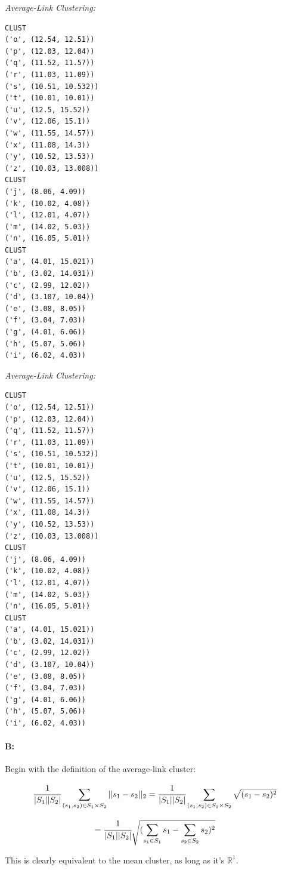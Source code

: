 \documentclass[11pt]{article}
\begin{document}
\textit{Average-Link Clustering:}
\begin{verbatim}
CLUST
('o', (12.54, 12.51))
('p', (12.03, 12.04))
('q', (11.52, 11.57))
('r', (11.03, 11.09))
('s', (10.51, 10.532))
('t', (10.01, 10.01))
('u', (12.5, 15.52))
('v', (12.06, 15.1))
('w', (11.55, 14.57))
('x', (11.08, 14.3))
('y', (10.52, 13.53))
('z', (10.03, 13.008))
CLUST
('j', (8.06, 4.09))
('k', (10.02, 4.08))
('l', (12.01, 4.07))
('m', (14.02, 5.03))
('n', (16.05, 5.01))
CLUST
('a', (4.01, 15.021))
('b', (3.02, 14.031))
('c', (2.99, 12.02))
('d', (3.107, 10.04))
('e', (3.08, 8.05))
('f', (3.04, 7.03))
('g', (4.01, 6.06))
('h', (5.07, 5.06))
('i', (6.02, 4.03))

\end{verbatim}

\textit{Average-Link Clustering:}
\begin{verbatim}
CLUST
('o', (12.54, 12.51))
('p', (12.03, 12.04))
('q', (11.52, 11.57))
('r', (11.03, 11.09))
('s', (10.51, 10.532))
('t', (10.01, 10.01))
('u', (12.5, 15.52))
('v', (12.06, 15.1))
('w', (11.55, 14.57))
('x', (11.08, 14.3))
('y', (10.52, 13.53))
('z', (10.03, 13.008))
CLUST
('j', (8.06, 4.09))
('k', (10.02, 4.08))
('l', (12.01, 4.07))
('m', (14.02, 5.03))
('n', (16.05, 5.01))
CLUST
('a', (4.01, 15.021))
('b', (3.02, 14.031))
('c', (2.99, 12.02))
('d', (3.107, 10.04))
('e', (3.08, 8.05))
('f', (3.04, 7.03))
('g', (4.01, 6.06))
('h', (5.07, 5.06))
('i', (6.02, 4.03))
\end{verbatim}


\paragraph{B: }

Begin with the definition of the average-link cluster:

\begin{equation}
\cfrac{1}{|S_1||S_2|} \sum_{(s_1,s_2) \in S_1 \times S_2} || s_1 - s_2||_2 = \cfrac{1}{|S_1||S_2|} \sum_{(s_1,s_2) \in S_1 \times S_2} \sqrt{(s_1 - s_2)^2}
\end{equation}

\begin{equation}
= \cfrac{1}{|S_1||S_2|} \sqrt{(\sum_{s_1 \in S_1} s_1 - \sum_{s_2 \in S_2} s_2)^2}
\end{equation}

This is clearly equivalent to the mean cluster, as long as it's $\mathbb{R}^1$.
\end{document}
